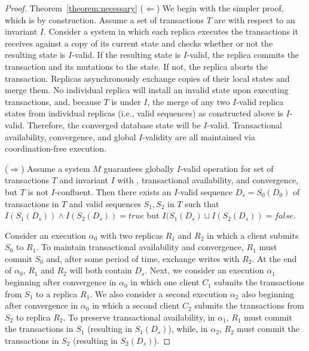 \begin{proof}{Theorem~\ref{theorem:necessary}}
($\Leftarrow$) We begin with the simpler proof, which is by
  construction. Assume a set of transactions $T$ are \iconfluent with
  respect to an invariant $I$. Consider a system in which each replica
  executes the transactions it receives against a copy of its current
  state and checks whether or not the resulting state is $I$-valid. If
  the resulting state is $I$-valid, the replica commits the
  transaction and its mutations to the state. If not, the replica
  aborts the transaction. Replicas asynchronously exchange copies of
  their local states and merge them. No individual replica will
  install an invalid state upon executing transactions, and, because
  $T$ is \iconfluent under $I$, the merge of any two $I$-valid replica
  states from individual replicas (i.e., valid sequences) as
  constructed above is $I$-valid. Therefore, the converged database
  state will be $I$-valid. Transactional availability, convergence,
  and global $I$-validity are all maintained via coordination-free
  execution.

($\Rightarrow$) Assume a system $M$ guarantees globally $I$-valid
  operation for set of transactions $T$ and invariant $I$ with
  \cfreedom, transactional availability, and convergence, but $T$ is
  not $I$-confluent. Then there exists an $I$-valid sequence
  $D_s=S_0(D_0)$ of transactions in $T$ and valid sequences $S_1,S_2$
  in $T$ such that $I(S_1(D_s)) \wedge I(S_2(D_s)) = true$
  but $I(S_1(D_s) \sqcup I(S_2(D_s)) = false$.

  Consider an execution $\alpha_0$ with two replicas $R_1$ and $R_2$
  in which a client submits $S_0$ to $R_1$. To maintain transactional
  availability and convergence, $R_1$ must commit $S_0$ and, after
  some period of time, exchange writes with $R_2$. At the end of
  $\alpha_0$, $R_1$ and $R_2$ will both contain $D_s$. Next, we
  consider an execution $\alpha_1$ beginning after convergence in
  $\alpha_0$ in which one client $C_1$ submits the transactions from
  $S_1$ to a replica $R_1$. We also consider a second execution
  $\alpha_2$ also beginning after convergence in $\alpha_0$ in which a
  second client $C_2$ submits the transactions from $S_2$ to replica
  $R_2$. To preserve transactional availability, in $\alpha_1$, $R_1$
  must commit the transactions in $S_1$ (resulting in $S_1(D_s)$),
  while, in $\alpha_2$, $R_2$ must commit the transactions in $S_2$
  (resulting in $S_2(D_s)$).


\end{proof}
